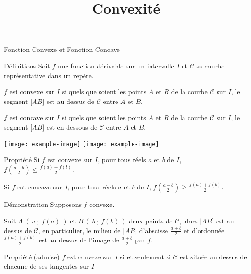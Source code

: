 \documentclass{cours}
\title{Convexité}
\begin{document}

    \begin{Gpartie}{Fonction Convexe et Fonction Concave} 
        \begin{Spartie}{Définitions} 
            Soit $f$ une fonction dérivable sur un intervalle $I$ et $\mathcal{C}$ sa courbe représentative dans un repère.

            $f$ est convexe sur $I$ si quels que soient les points $A$ et $B$ de la courbe $\mathcal{C}$ sur $I$, le segment $\big[AB\big]$ est au dessus de $\mathcal{C}$ entre $A$ et $B$.

            $f$ est concave sur $I$ si quels que soient les points $A$ et $B$ de la courbe $\mathcal{C}$ sur $I$, le segment $\big[AB\big]$ est en dessous de $\mathcal{C}$ entre $A$ et $B$.

            \begin{center}
                    \texttt{[image: example-image]}
                    \texttt{[image: example-image]}
                \parbox{\linewidth}{}
            \end{center}
        \end{Spartie}
        \begin{Spartie}{Propriété} 
            Si $f$ est convexe sur $I$, pour tous réels $a$ et $b$ de $I$, $f\left(\frac{a+b}{2}\right)\leq\frac{f(a)+f(b)}{2}$.

            Si $f$ est concave sur $I$, pour tous réels $a$ et $b$ de $I$, $f\left(\frac{a+b}{2}\right)\geq\frac{f(a)+f(b)}{2}$.
            \begin{SSpartie}{Démonstration} 
                Supposons $f$ convexe.

                Soit $A~\left(~a~;~f(a)~\right)$ et $B~\left(~b~;~f(b)~\right)$ deux points de $\mathcal{C}$, alors $\big[AB\big]$ est au dessus de $\mathcal{C}$, en particulier, le milieu de $\big[AB\big]$ d'abscisse $\frac{a+b}{2}$ et d'ordonnée $\frac{f(a)+f(b)}{2}$ est au dessus de l'image de $\frac{a+b}{2}$ par $f$.
            \end{SSpartie}
        \end{Spartie}
        \begin{Spartie}{Propriété (admise)} 
            $f$ est convexe sur $I$ si et seulement si $\mathcal{C}$ est située au dessus de chacune de ses tangentes sur $I$


\end{Spartie}
\end{Gpartie}
\end{document}
